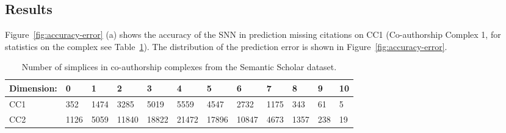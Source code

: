\subsection{Results}
Figure~\ref{fig:accuracy-error} (a) shows the accuracy of the SNN in prediction missing citations on CC1 (Co-authorship Complex 1, for statistics on the complex see Table~\ref{table:Simplices-coauthor}). The distribution of the prediction error is shown in Figure~\ref{fig:accuracy-error}. 
\begin{table}[htbp]
  \label{table:Simplices-coauthor}
  \centering
  \scriptsize{
  \begin{tabular}{llllllllllll}
    \cmidrule(r){1-12}
    Dimension:   & 0     & 1  & 2     & 3 & 4     & 5 & 6    & 7 & 8   & 9 & 10\\
    \midrule
    CC1 & 352  & 1474  & 3285  & 5019  & 5559  & 4547  & 2732  & 1175  & 343 & 61 & 5\\
    CC2 & 1126 & 5059 & 11840 & 18822 & 21472 & 17896  & 10847 & 4673 & 1357 & 238 & 19\\ 
    \bottomrule
  \end{tabular}}
  \vspace{2pt}
  \caption{%
  Number of simplices in co-authorship complexes from the Semantic Scholar dataset.
  }
\end{table}
